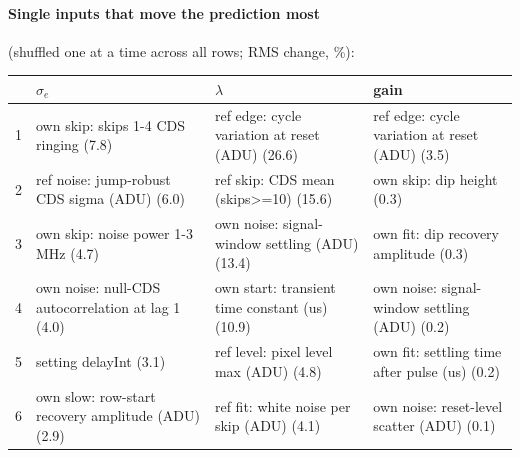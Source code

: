 \paragraph{Single inputs that move the prediction most} (shuffled one at a time across all rows; RMS change, \%):
\begin{center}\footnotesize
\begin{tabular}{rp{}p{}p{}}
\toprule
 & $\sigma_e$ & $\lambda$ & gain \\
\midrule
1 & own skip: skips 1-4 CDS ringing (7.8) & ref edge: cycle variation at reset (ADU) (26.6) & ref edge: cycle variation at reset (ADU) (3.5) \\
2 & ref noise: jump-robust CDS sigma (ADU) (6.0) & ref skip: CDS mean (skips>=10) (15.6) & own skip: dip height (0.3) \\
3 & own skip: noise power 1-3 MHz (4.7) & own noise: signal-window settling (ADU) (13.4) & own fit: dip recovery amplitude (0.3) \\
4 & own noise: null-CDS autocorrelation at lag 1 (4.0) & own start: transient time constant (us) (10.9) & own noise: signal-window settling (ADU) (0.2) \\
5 & setting delayInt (3.1) & ref level: pixel level max (ADU) (4.8) & own fit: settling time after pulse (us) (0.2) \\
6 & own slow: row-start recovery amplitude (ADU) (2.9) & ref fit: white noise per skip (ADU) (4.1) & own noise: reset-level scatter (ADU) (0.1) \\
\bottomrule
\end{tabular}
\end{center}
